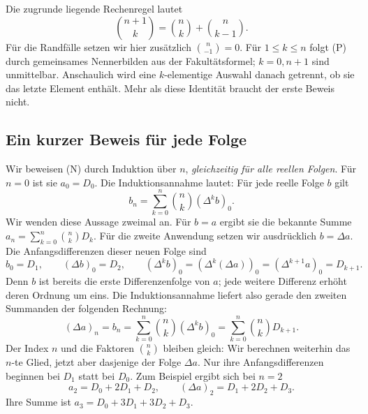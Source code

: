 Die zugrunde liegende Rechenregel lautet
\begin{equation}\tag{P}\label{newton:pascal}
 \binom{n+1}{k}=\binom nk+\binom n{k-1}.
\end{equation}
Für die Randfälle setzen wir hier zusätzlich $\binom n{-1}=0$.
Für $1\leq k\leq n$ folgt (P) durch gemeinsames Nennerbilden aus der
Fakultätsformel; $k=0,n+1$ sind unmittelbar. Anschaulich wird eine
$k$-elementige Auswahl danach getrennt, ob sie das letzte Element
enthält. Mehr als diese Identität braucht der erste Beweis nicht.

\subsection*{Ein kurzer Beweis für jede Folge}

Wir beweisen (N) durch Induktion über $n$, \emph{gleichzeitig für alle
reellen Folgen}. Für $n=0$ ist sie $a_0=D_0$. Die Induktionsannahme
lautet: Für jede reelle Folge $b$ gilt
\[
 b_n=\sum_{k=0}^n\binom nk(\Delta^kb)_0.
\]
Wir wenden diese Aussage zweimal an. Für $b=a$ ergibt sie die
bekannte Summe $a_n=\sum_{k=0}^n\binom nkD_k$.
Für die zweite Anwendung setzen wir ausdrücklich $b=\Delta a$.
Die Anfangsdifferenzen dieser neuen Folge sind
\[
 b_0=D_1,\qquad (\Delta b)_0=D_2,\qquad
 (\Delta^kb)_0=(\Delta^k(\Delta a))_0
               =(\Delta^{k+1}a)_0=D_{k+1}.
\]
Denn $b$ ist bereits die erste Differenzenfolge von $a$; jede weitere
Differenz erhöht deren Ordnung um eins. Die Induktionsannahme liefert
also gerade den zweiten Summanden der folgenden Rechnung:
\[
 \boxed{\displaystyle
 (\Delta a)_n=b_n
 =\sum_{k=0}^n\binom nk(\Delta^kb)_0
 =\sum_{k=0}^n\binom nkD_{k+1}.}
\]
Der Index $n$ und die Faktoren $\binom nk$ bleiben gleich: Wir berechnen
weiterhin das $n$-te Glied, jetzt aber dasjenige der Folge $\Delta a$.
Nur ihre Anfangsdifferenzen beginnen bei $D_1$ statt bei $D_0$.
Zum Beispiel ergibt sich bei $n=2$
\[
 a_2=D_0+2D_1+D_2,\qquad
 (\Delta a)_2=D_1+2D_2+D_3.
\]
Ihre Summe ist $a_3=D_0+3D_1+3D_2+D_3$.

